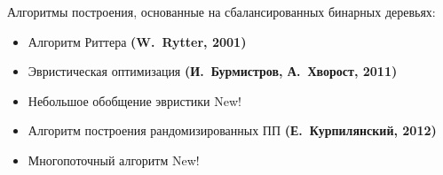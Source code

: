 ﻿\documentclass[10pt,pdf,hyperref={unicode}]{beamer}
\begin{document}
\begin{frame}


\begin{block}{Алгоритмы построения, основанные на сбалансированных бинарных деревьях:}
	\begin{itemize}
		\pause
		\item Алгоритм Риттера {\bf (W.~Rytter, 2001)}
		\pause
		\item Эвристическая оптимизация {\bf (И.~Бурмистров, А.~Хворост, 2011)}
		\pause
		\item Небольшое обобщение эвристики {\color{red} New!}
		\pause
		\item Алгоритм построения рандомизированных ПП {\bf (Е.~Курпилянский, 2012)}
		\pause
		\item Многопоточный алгоритм {\color{red} New!}
	\end{itemize}
\end{block}

\pause


\end{frame}
\end{document}
